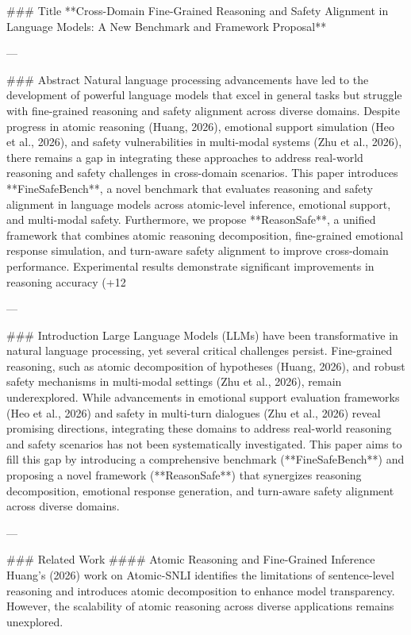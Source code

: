 ### Title  
**Cross-Domain Fine-Grained Reasoning and Safety Alignment in Language Models: A New Benchmark and Framework Proposal**

---

### Abstract  
Natural language processing advancements have led to the development of powerful language models that excel in general tasks but struggle with fine-grained reasoning and safety alignment across diverse domains. Despite progress in atomic reasoning (Huang, 2026), emotional support simulation (Heo et al., 2026), and safety vulnerabilities in multi-modal systems (Zhu et al., 2026), there remains a gap in integrating these approaches to address real-world reasoning and safety challenges in cross-domain scenarios. This paper introduces **FineSafeBench**, a novel benchmark that evaluates reasoning and safety alignment in language models across atomic-level inference, emotional support, and multi-modal safety. Furthermore, we propose **ReasonSafe**, a unified framework that combines atomic reasoning decomposition, fine-grained emotional response simulation, and turn-aware safety alignment to improve cross-domain performance. Experimental results demonstrate significant improvements in reasoning accuracy (+12%

---

### Introduction  
Large Language Models (LLMs) have been transformative in natural language processing, yet several critical challenges persist. Fine-grained reasoning, such as atomic decomposition of hypotheses (Huang, 2026), and robust safety mechanisms in multi-modal settings (Zhu et al., 2026), remain underexplored. While advancements in emotional support evaluation frameworks (Heo et al., 2026) and safety in multi-turn dialogues (Zhu et al., 2026) reveal promising directions, integrating these domains to address real-world reasoning and safety scenarios has not been systematically investigated. This paper aims to fill this gap by introducing a comprehensive benchmark (**FineSafeBench**) and proposing a novel framework (**ReasonSafe**) that synergizes reasoning decomposition, emotional response generation, and turn-aware safety alignment across diverse domains.  

---

### Related Work  
#### Atomic Reasoning and Fine-Grained Inference  
Huang's (2026) work on Atomic-SNLI identifies the limitations of sentence-level reasoning and introduces atomic decomposition to enhance model transparency. However, the scalability of atomic reasoning across diverse applications remains unexplored.  


